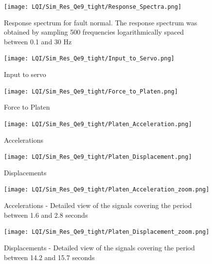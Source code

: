 \documentclass[9pt]{extarticle}
\begin{document}
    

\begin{figure}[H]
    \centering
    \texttt{[image: LQI/Sim\_Res\_Qe9\_tight/Response\_Spectra.png]}
    \caption{Response spectrum for fault normal. The response spectrum was obtained by sampling 500 frequencies logarithmically spaced between 0.1 and 30 Hz}%
    \label{fig_resp_spectrum_LQI_Qe9}
\end{figure}


\begin{figure}[H]
\begin{minipage}{0.49\textwidth}
    \centering
    \texttt{[image: LQI/Sim\_Res\_Qe9\_tight/Input\_to\_Servo.png]}
    \caption{Input to servo}
    \label{fig_Input_to_Servo_LQI_Qe9}
\end{minipage}
\hfill
\begin{minipage}{0.49\textwidth}
    \centering
    \texttt{[image: LQI/Sim\_Res\_Qe9\_tight/Force\_to\_Platen.png]}
    \caption{Force to Platen}
    \label{fig_Force_LQI_Qe9} 
\end{minipage}
\end{figure}
   
\begin{figure}[H]
\begin{minipage}{0.49\textwidth}
    \centering
    \texttt{[image: LQI/Sim\_Res\_Qe9\_tight/Platen\_Acceleration.png]}
    \caption{Accelerations}
    \label{fig_Platen_Acceleration_LQI_Qe9}
\end{minipage}
\hfill
\begin{minipage}{0.49\textwidth}
    \centering
    \texttt{[image: LQI/Sim\_Res\_Qe9\_tight/Platen\_Displacement.png]}
    \caption{Displacements}
    \label{fig_Platen_Displacement_LQI_Qe9}
\end{minipage}
\end{figure}

\begin{figure}[H]
\begin{minipage}{0.49\textwidth}
    \centering
    \texttt{[image: LQI/Sim\_Res\_Qe9\_tight/Platen\_Acceleration\_zoom.png]}
    \caption{Accelerations - Detailed view of the signals covering the period between 1.6 and 2.8 seconds}
    \label{fig_Platen_Acceleration_zoom_LQI_Qe9}
\end{minipage}
\hfill
\begin{minipage}{0.49\textwidth}
    \centering
    \texttt{[image: LQI/Sim\_Res\_Qe9\_tight/Platen\_Displacement\_zoom.png]}
    \caption{Displacements - Detailed view of the signals covering the period between 14.2 and 15.7 seconds}
    \label{fig_Platen_Displacement_zoom_LQI_Qe9}
\end{minipage}
\end{figure}
\end{document}
